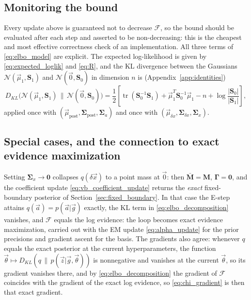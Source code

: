 \documentclass{article}
\begin{document}
\subsection{Monitoring the bound} \label{sec:monitoring}
Every update above is guaranteed not to decrease $\mathcal F$, so the bound should be evaluated after each step and asserted to be non-decreasing: this is the cheapest and most effective correctness check of an implementation. All three terms of \eqref{eq:elbo_model} are explicit. The expected log-likelihood is given by \eqref{eq:expected_loglik} and \eqref{eq:R}, and the KL divergence between the Gaussians $\mathcal N(\vec\mu_1, \mathbf S_1)$ and $\mathcal N(\vec 0, \mathbf S_0)$ in dimension $n$ is (Appendix~\ref{app:identities})
\begin{equation}
    D_{KL}\big(\mathcal N(\vec\mu_1, \mathbf S_1)\,\|\,\mathcal N(\vec 0, \mathbf S_0)\big) = \frac12\left[\operatorname{tr}(\mathbf S_0^{-1}\mathbf S_1) + \vec\mu_1^T\mathbf S_0^{-1}\vec\mu_1 - n + \log\frac{|\mathbf S_0|}{|\mathbf S_1|}\right], \label{eq:gaussian_kl}
\end{equation}
applied once with $(\vec\mu_{\text{post}}, \mathbf{\Sigma}_{\text{post}}, \mathbf{\Sigma}_a)$ and once with $(\vec\mu_{\delta x}, \mathbf{\Sigma}_{\delta x}, \mathbf{\Sigma}_x)$.

\subsection{Special cases, and the connection to exact evidence maximization} \label{sec:special_cases}
Setting $\mathbf{\Sigma}_x \to \mathbf 0$ collapses $q(\delta\vec x)$ to a point mass at $\vec 0$: then $\bar{\mathbf M} = \mathbf M$, $\mathbf\Gamma = \mathbf 0$, and the coefficient update \eqref{eq:vb_coefficient_update} returns the \emph{exact} fixed-boundary posterior of Section~\ref{sec:fixed_boundary}. In that case the E-step attains $q(\vec a) = p(\vec a|\vec g)$ exactly, the KL term in \eqref{eq:elbo_decomposition} vanishes, and $\mathcal F$ equals the log evidence: the loop becomes exact evidence maximization, carried out with the EM update \eqref{eq:alpha_update} for the prior precisions and gradient ascent for the basis. The gradients also agree: whenever $q$ equals the exact posterior at the current hyperparameters, the function $\vec\theta \mapsto D_{KL}(q\,\|\,p(\vec z|\vec g,\vec\theta))$ is nonnegative and vanishes at the current $\vec\theta$, so its gradient vanishes there, and by \eqref{eq:elbo_decomposition} the gradient of $\mathcal F$ coincides with the gradient of the exact log evidence, so \eqref{eq:chi_gradient} is then that exact gradient.
\end{document}
